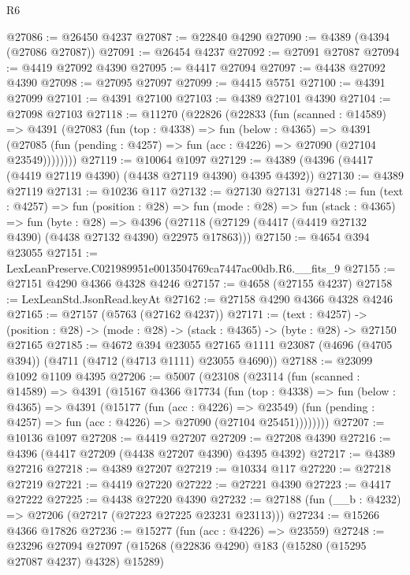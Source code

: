 \begin{lexlean}{R6}
\begin{coremodule}
@27086 := @26450 @4237
@27087 := @22840 @4290
@27090 := @4389 (@4394 (@27086 @27087))
@27091 := @26454 @4237
@27092 := @27091 @27087
@27094 := @4419 @27092 @4390
@27095 := @4417 @27094
@27097 := @4438 @27092 @4390
@27098 := @27095 @27097
@27099 := @4415 @5751
@27100 := @4391 @27099
@27101 := @4391 @27100
@27103 := @4389 @27101 @4390
@27104 := @27098 @27103
@27118 := @11270
    (@22826
      (@22833
        (fun (scanned : @14589) =>
        @4391
          (@27083
            (fun (top : @4338) =>
            fun (below : @4365) =>
            @4391
              (@27085 (fun (pending : @4257) => fun (acc : @4226) => @27090 (@27104 @23549))))))))
@27119 := @10064 @1097
@27129 := @4389 (@4396 (@4417 (@4419 @27119 @4390) (@4438 @27119 @4390) @4395 @4392))
@27130 := @4389 @27119
@27131 := @10236 @117
@27132 := @27130 @27131
@27148 := fun (text : @4257) =>
  fun (position : @28) =>
  fun (mode : @28) =>
  fun (stack : @4365) =>
  fun (byte : @28) =>
  @4396 (@27118 (@27129 (@4417 (@4419 @27132 @4390) (@4438 @27132 @4390) @22975 @17863)))
@27150 := @4654 @394 @23055
@27151 := LexLeanPreserve.C021989951e0013504769ca7447ac00db.R6.__fits_9
@27155 := @27151 @4290 @4366 @4328 @4246
@27157 := @4658 (@27155 @4237)
@27158 := LexLeanStd.JsonRead.keyAt
@27162 := @27158 @4290 @4366 @4328 @4246
@27165 := @27157 (@5763 (@27162 @4237))
@27171 := (text : @4257) ->
  (position : @28) -> (mode : @28) -> (stack : @4365) -> (byte : @28) -> @27150 @27165
@27185 := @4672
    @394
    @23055
    @27165
    @1111
    @23087
    (@4696 (@4705 @394))
    (@4711 (@4712 (@4713 @1111) @23055 @4690))
@27188 := @23099 @1092 @1109 @4395
@27206 := @5007
    (@23108
      (@23114
        (fun (scanned : @14589) =>
        @4391
          (@15167
            @4366
            @17734
            (fun (top : @4338) =>
            fun (below : @4365) =>
            @4391
              (@15177
                (fun (acc : @4226) => @23549)
                (fun (pending : @4257) => fun (acc : @4226) => @27090 (@27104 @25451))))))))
@27207 := @10136 @1097
@27208 := @4419 @27207
@27209 := @27208 @4390
@27216 := @4396 (@4417 @27209 (@4438 @27207 @4390) @4395 @4392)
@27217 := @4389 @27216
@27218 := @4389 @27207
@27219 := @10334 @117
@27220 := @27218 @27219
@27221 := @4419 @27220
@27222 := @27221 @4390
@27223 := @4417 @27222
@27225 := @4438 @27220 @4390
@27232 := @27188 (fun (__b : @4232) => @27206 (@27217 (@27223 @27225 @23231 @23113)))
@27234 := @15266 @4366 @17826
@27236 := @15277 (fun (acc : @4226) => @23559)
@27248 := @23296
    @27094
    @27097
    (@15268 (@22836 @4290) @183 (@15280 (@15295 @27087 @4237) @4328) @15289)

\end{coremodule}
\end{lexlean}
